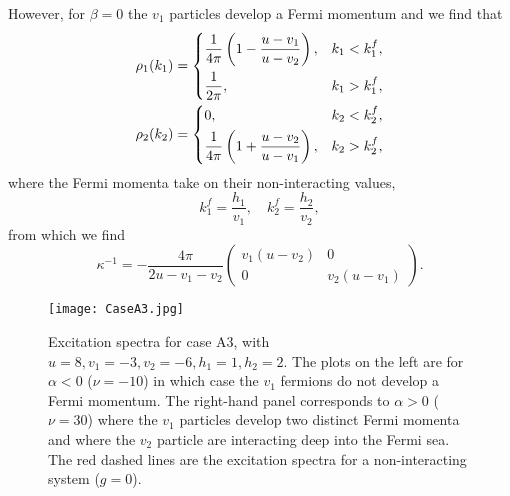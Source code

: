 \documentclass[aps,pra,
superscriptaddress,
reprint,twocolumn,preprintnumbers,
amsmath,amssymb,
nofootinbib]{revtex4-1}
\newcommand{\beq}{\begin{equation}}
\newcommand{\eeq}{\end{equation}}
\begin{document}
However, for $\beta = 0$ the $v_1$ particles develop a Fermi momentum and we find that 
        \begin{align}
        &\rho_1(k_1) = 
        \begin{dcases}
        \frac{1}{4\pi} \left(1 - \frac{u - v_1}{u - v_2} \right), &k_1<k_1^f ,\\
        \frac{1}{2\pi}, &k_1>k_1^f,
        \end{dcases} \nonumber\\
        &\rho_2(k_2) = 
        \begin{dcases}
        0, &k_2<k_2^f,\\
        \frac{1}{4\pi} \left(1 + \frac{u - v_2}{u - v_1} \right), &k_2>k_2^f,
        \end{dcases}
        \end{align}
where the Fermi momenta take on their non-interacting values,
\beq
k_1^f = \frac{h_1}{v_1},\quad k_2^f = \frac{h_2}{v_2},
\eeq            
from which we find
        \begin{equation}
        \kappa^{-1} = -\frac{4 \pi}{2u - v_1 - v_2} \left(
        \begin{array}{cc}
        v_1 (u - v_2) & 0\\
        0 & v_2 (u - v_1)
        \end{array} \right).
        \end{equation}   
	\begin{figure}[t]
    \texttt{[image: CaseA3.jpg]}
    \centering
    \caption{\label{fig:07} Excitation spectra for case A3, with $u = 8,v_1 = -3,v_2 = -6,h_1 = 1,h_2 = 2$. The plots on the left are for $\alpha<0$ ($\nu = -10$) in which case the $v_1$ fermions do not develop a Fermi momentum. The right-hand panel corresponds to $\alpha>0$ ($\nu = 30$) where the $v_1$ particles develop two distinct Fermi momenta and where the $v_2$ particle are interacting deep into the Fermi sea. The red dashed lines are the excitation spectra for a non-interacting system ($g = 0$).}
    \end{figure}
    
\end{document}
